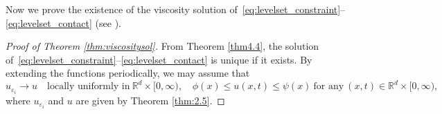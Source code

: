 \documentclass{amsart}
\theoremstyle{definition}
\def\R{{\mathbb{R}}}
\begin{document}
\bigskip

Now we prove the existence of the viscosity solution of~\eqref{eq:levelset_constraint}--\eqref{eq:levelset_contact} (see \cite[Theorem 4.2]{MR1100206}).

\begin{proof}[Proof of Theorem \ref{thm:viscositysol}]
From Theorem \ref{thm4.4}, the solution of~\eqref{eq:levelset_constraint}--\eqref{eq:levelset_contact} is unique if it exists.
    By extending the functions periodically, we may assume that
\begin{equation}\label{eq:ap1}
u _{\varepsilon_i} \to u
\quad 
\text{locally uniformly in}
\ \R^d \times [0,\infty), \quad
\phi (x) \leq u (x,t) \leq \psi (x) \ \text{for any} \ (x,t) \in \R^d \times [0,\infty),
\end{equation}
where $u_{\varepsilon_i}$ and $u$ are given by Theorem \ref{thm:2.5}.


\end{proof}
\end{document}
